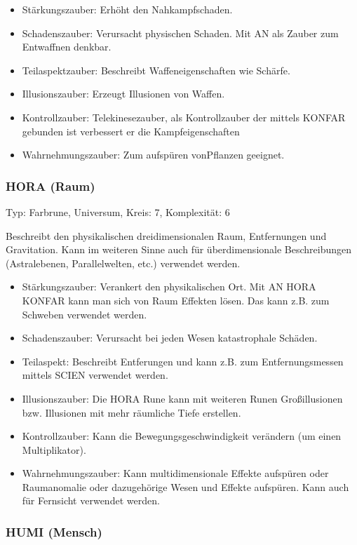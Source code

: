 \documentclass{article}
\begin{document}
\begin{itemize}
\item Stärkungszauber: Erhöht den Nahkampfschaden.
\item Schadenszauber: Verursacht physischen Schaden. Mit AN als Zauber zum Entwaffnen denkbar.
\item Teilaspektzauber: Beschreibt Waffeneigenschaften wie Schärfe.
\item Illusionszauber: Erzeugt Illusionen von Waffen.
\item Kontrollzauber: Telekinesezauber, als Kontrollzauber der mittels KONFAR gebunden ist verbessert er die Kampfeigenschaften
\item Wahrnehmungszauber: Zum aufspüren vonPflanzen geeignet.
\end{itemize}


\subsubsection{HORA (Raum)}

Typ: Farbrune, Universum, Kreis: 7, Komplexität: 6

Beschreibt den physikalischen dreidimensionalen Raum, Entfernungen und Gravitation. Kann im weiteren Sinne auch für
überdimensionale Beschreibungen (Astralebenen, Parallelwelten, etc.) verwendet werden.

\begin{itemize}
\item Stärkungszauber: Verankert den physikalischen Ort. Mit AN HORA KONFAR kann man sich von Raum Effekten lösen. Das kann z.B. zum Schweben verwendet werden.
\item Schadenszauber: Verursacht bei jeden Wesen katastrophale Schäden.
\item Teilaspekt: Beschreibt Entferungen und kann z.B. zum Entfernungsmessen mittels SCIEN verwendet werden.
\item Illusionszauber: Die HORA Rune kann mit weiteren Runen Großillusionen bzw. Illusionen mit mehr räumliche Tiefe erstellen.
\item Kontrollzauber: Kann die Bewegungsgeschwindigkeit verändern (um einen Multiplikator).
\item Wahrnehmungszauber: Kann multidimensionale Effekte aufspüren oder Raumanomalie oder dazugehörige Wesen und Effekte aufspüren. Kann auch für Fernsicht verwendet werden.
\end{itemize}

\subsubsection{HUMI (Mensch)}
\end{document}
